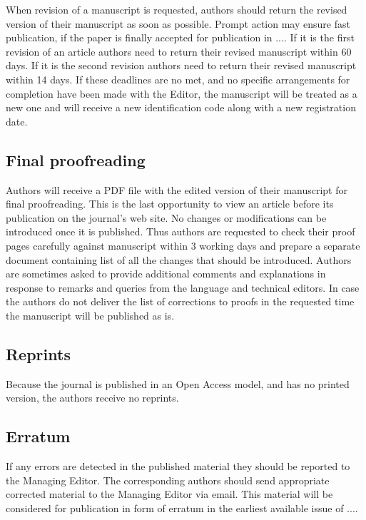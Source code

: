 \documentclass[USenglish,oneside,twocolumn]{article}
\begin{document}
When revision of a manuscript is requested, authors should return the revised version of their manuscript as soon as possible. Prompt action may ensure fast publication, if the paper is finally accepted for publication in .... If it is the first revision of an article authors need to return their revised manuscript within 60 days. If it is the second revision authors need to return their revised manuscript within 14 days. If these deadlines are no met, and no specific arrangements for completion have been made with the Editor, the manuscript will be treated as a new one and will receive a new identification code along with a new registration date.

\subsection{Final proofreading}

Authors will receive a PDF file with the edited version of their manuscript for final proofreading. This is the last opportunity to view an article before its publication on the journal's web site. No changes or modifications can be introduced once it is published. Thus authors are requested to check their proof pages carefully against manuscript within 3 working days and prepare a separate document containing list of all the changes that should be introduced. Authors are sometimes asked to provide additional comments and explanations in response to remarks and queries from the language and technical editors. In case the authors do not deliver the list of corrections to proofs in the requested time the manuscript will be published as is.

 

\subsection{Reprints}

Because the journal is published in an Open Access model, and has no printed version, the authors receive no reprints.

\subsection{Erratum}

If any errors are detected in the published material they should be reported to the Managing Editor. The corresponding authors should send appropriate corrected material to the Managing Editor via email. This material will be considered for publication in form of erratum in the earliest available issue of ....
\end{document}
